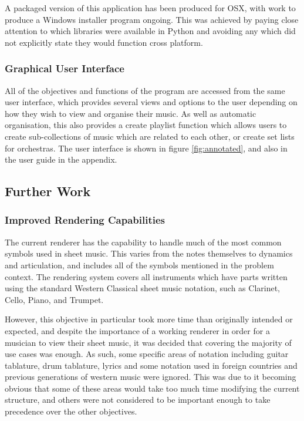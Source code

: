 A packaged version of this application has been produced for OSX, with work to produce a Windows installer program ongoing. This was achieved by paying close attention to which libraries were available in Python and avoiding any which did not explicitly state they would function cross platform.

\subsubsection{Graphical User Interface}
All of the objectives and functions of the program are accessed from the same user interface, which provides several views and options to the user depending on how they wish to view and organise their music. As well as automatic organisation, this also provides a create playlist function which allows users to create sub-collections of music which are related to each other, or create set lists for orchestras. The user interface is shown in figure \ref{fig:annotated}, and also in the user guide in the appendix.


\subsection{Further Work}
\subsubsection{Improved Rendering Capabilities}
The current renderer has the capability to handle much of the most common symbols used in sheet music. This varies from the notes themselves to dynamics and articulation, and includes all of the symbols mentioned in the problem context. The rendering system covers all instruments which have parts written using the standard Western Classical sheet music notation, such as Clarinet, Cello, Piano, and Trumpet.

However, this objective in particular took more time than originally intended or expected, and despite the importance of a working renderer in order for a musician to view their sheet music, it was decided that covering the majority of use cases was enough. As such, some specific areas of notation including guitar tablature, drum tablature, lyrics and some notation used in foreign countries and previous generations of western music were ignored. This was due to it becoming obvious that some of these areas would take too much time modifying the current structure, and others were not considered to be important enough to take precedence over the other objectives.

